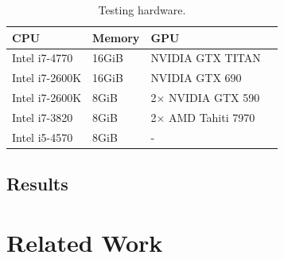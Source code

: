 \begin{table}
\footnotesize
\centering
\begin{tabular}{| l | l | l | l |}
\hline
\textbf{CPU} & \textbf{Memory} & \textbf{GPU}\\
\hline
Intel i7-4770 & 16GiB & NVIDIA GTX TITAN\\
Intel i7-2600K & 16GiB & NVIDIA GTX 690\\
Intel i7-2600K & 8GiB & 2$\times$ NVIDIA GTX 590\\
Intel i7-3820 & 8GiB & 2$\times$ AMD Tahiti 7970\\
Intel i5-4570 & 8GiB & -\\
\hline
\end{tabular}
\caption{Testing hardware.}
\end{table}

\subsection*{Results}

\section*{Related Work}

\cite{Lutz2013}

\cite{Kamil2010}


